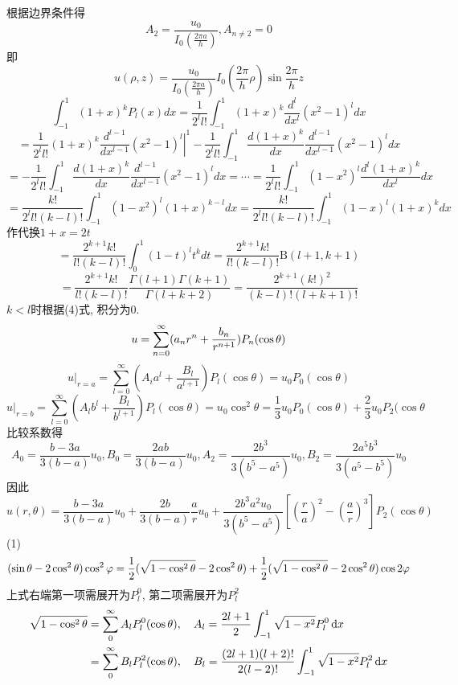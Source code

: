 \documentclass[UTF8,9pt]{ctexart}
\begin{document}
根据边界条件得
$$ 
A_{2}=\frac{u_{0}}{I_{0}\left(\frac{2 \pi a}{h}\right)}, A_{n\neq2}=0
$$即$$ 
u(\rho, z)=\frac{u_{0}}{I_{0}\left(\frac{2 \pi a}{h}\right)} I_{0}\left(\frac{2 \pi}{h} \rho\right) \sin \frac{2 \pi}{h} z
$$
$$ 
\int_{-1}^{1}(1+x)^{k} P_{l}(x) d x=\frac{1}{2^{l} l !} \int_{-1}^{1}(1+x)^{k} \frac{d^{l}}{d x^{l}}\left(x^{2}-1\right)^{l} d x
$$$$ 
=\frac{1}{2^{l} l !}(1+x)^{k} \frac{d^{l-1}}{d x^{l-1}}\left.\left(x^{2}-1\right)^{l}\right|^{1}-\frac{1}{2^{l} l !} \int_{-1}^{1} \frac{d(1+x)^{k}}{d x} \frac{d^{l-1}}{d x^{l-1}}\left(x^{2}-1\right)^{l} d x
$$\begin{equation} 
=-\frac{1}{2^{l} l !} \int_{-1}^{1} \frac{d(1+x)^{k}}{d x} \frac{d^{l-1}}{d x^{l-1}}\left(x^{2}-1\right)^{l} d x=\cdots=\frac{1}{2^{l} l !} \int_{-1}^{1}\left(1-x^{2}\right)^{l} \frac{d^{l}(1+x)^{k}}{d x^{l}} d x
\end{equation}$$ 
=\frac{k !}{2^{l} l !(k-l) !} \int_{-1}^{1}\left(1-x^{2}\right)^{l}(1+x)^{k-l} d x=\frac{k !}{2^{l} l !(k-l) !} \int_{-1}^{1}(1-x)^{l}(1+x)^{k} d x
$$作代换$1+x=2t$$$ 
=\frac{2^{k+1} k !}{l !(k-l) !} \int_{0}^{1}(1-t)^{l} t^{k} d t=\frac{2^{k+1} k !}{l !(k-l) !} \mathrm{B}(l+1, k+1)
$$$$ 
=\frac{2^{k+1} k !}{l !(k-l) !} \frac{\Gamma(l+1) \Gamma(k+1)}{\Gamma(l+k+2)}=\frac{2^{k+1}(k !)^{2}}{(k-l) !(l+k+1) !}
$$
$k<l$时根据(4)式, 积分为0. 
$$u=\sum_{n=0}^\infty(a_nr^n+\frac{b_n}{r^{n+1}})P_n(\cos\theta)$$
$$ 
\left.u\right|_{r=a}=\sum_{l=0}^{\infty}\left(A_{i} a^{l}+\frac{B_{l}}{a^{l+1}}\right) P_{l}(\cos \theta)=u_{0} P_{0}(\cos \theta)
$$$$ 
\left.u\right|_{r=b}=\sum_{l=0}^{\infty}\left(A_{l} b^{l}+\frac{B_{l}}{b^{l+1}}\right) P_{l}(\cos \theta)=u_{0} \cos ^{2} \theta=\frac{1}{3} u_{0} P_{0}(\cos \theta)+\frac{2}{3} u_{0} P_{2}(\cos \theta
$$比较系数得$$ 
A_{0}=\frac{b-3 a}{3(b-a)} u_{0}, B_{0}=\frac{2 a b}{3(b-a)} u_{0}, A_{2}=\frac{2 b^{3}}{3\left(b^{5}-a^{5}\right)} u_{0}, B_{2}=\frac{2 a^{5} b^{3}}{3\left(a^{5}-b^{5}\right)} u_{0}
$$因此$$ 
u(r, \theta)=\frac{b-3 a}{3(b-a)} u_{0}+\frac{2 b}{3(b-a)} \frac{a}{r} u_{0}+\frac{2 b^{3} a^{2} u_{0}}{3\left(b^{5}-a^{5}\right)}\left[\left(\frac{r}{a}\right)^{2}-\left(\frac{a}{r}\right)^{3}\right] P_{2}(\cos \theta)
$$
(1)\\
$$(\sin \theta-2\cos^2\theta)\cos^2\varphi = \frac{1}{2}(\sqrt{1-\cos^2\theta}-2\cos^2\theta)+\frac{1}{2}(\sqrt{1-\cos^2\theta}-2\cos^2\theta)\cos2\varphi$$
上式右端第一项需展开为$P^0_l$, 第二项需展开为$P^2_l$
$$\begin{aligned} 
    \sqrt{1-\cos^2\theta} &= \sum_0^\infty A_lP_l^0(\cos\theta),\quad A_l=\frac{2l+1}{2}\int_{-1}^1\sqrt{1-x^2}P_l^0\mathop{}\!\mathrm{d} x\\
    &= \sum_0^\infty B_lP_l^2(\cos\theta),\quad B_l=\frac{(2l+1)(l+2)!}{2(l-2)!}\int_{-1}^1\sqrt{1-x^2}P_l^2\mathop{}\!\mathrm{d} x
 \end{aligned}$$
\end{document}
